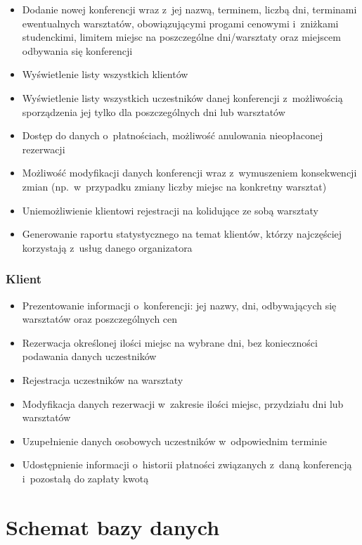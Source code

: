 \documentclass[12pt, a4paper]{mwrep}
\begin{document}
\begin{itemize}
  \item Dodanie nowej konferencji wraz z~jej nazwą, terminem, liczbą dni, terminami ewentualnych warsztatów, obowiązującymi progami cenowymi i~zniżkami studenckimi, limitem miejsc na poszczególne dni/warsztaty oraz miejscem odbywania się konferencji
  \item Wyświetlenie listy wszystkich klientów
  \item Wyświetlenie listy wszystkich uczestników danej konferencji z~możliwością sporządzenia jej tylko dla poszczególnych dni lub warsztatów
  \item Dostęp do danych o~płatnościach, możliwość anulowania nieopłaconej rezerwacji
  \item Możliwość modyfikacji danych konferencji wraz z~wymuszeniem konsekwencji zmian (np.~w~przypadku zmiany liczby miejsc na konkretny warsztat)
  \item Uniemożliwienie klientowi rejestracji na kolidujące ze sobą warsztaty
  \item Generowanie raportu statystycznego na temat klientów, którzy najczęściej korzystają z~usług danego organizatora
\end{itemize}

\subsection{Klient}

\begin{itemize}
  \item Prezentowanie informacji o~konferencji: jej nazwy, dni, odbywających się warsztatów oraz poszczególnych cen
  \item Rezerwacja określonej ilości miejsc na wybrane dni, bez konieczności podawania danych uczestników 
  \item Rejestracja uczestników na warsztaty
  \item Modyfikacja danych rezerwacji w~zakresie ilości miejsc, przydziału dni lub warsztatów
  \item Uzupełnienie danych osobowych uczestników w~odpowiednim terminie
  \item Udostępnienie informacji o~historii płatności związanych z~daną konferencją i~pozostałą do zapłaty kwotą
\end{itemize}

\lstset{style=SQLStyle}

\chapter{Schemat bazy danych}
\end{document}
